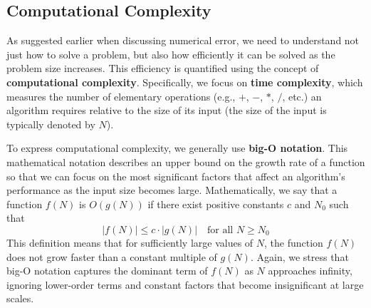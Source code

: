 \subsection{Computational Complexity}
As suggested earlier when discussing numerical error, we need to understand not just how to solve a problem, but also how efficiently it can be solved as the problem size increases. This efficiency is quantified using the concept of \textbf{computational complexity}. Specifically, we focus on \textbf{time complexity}, which measures the number of elementary operations (e.g., $+$, $-$, $*$, $/$, etc.) an algorithm requires relative to the size of its input (the size of the input is typically denoted by $N$).

To express computational complexity, we generally use \textbf{big-O notation}. This mathematical notation describes an upper bound on the growth rate of a function so that we can focus on the most significant factors that affect an algorithm's performance as the input size becomes large. Mathematically, we say that a function $f(N)$ is $O(g(N))$ if there exist positive constants $c$ and $N_0$ such that
\begin{equation*}
    \left|f(N)\right| \leq c \cdot \left|g(N)\right| \quad \text{for all } N \geq N_0
\end{equation*}
This definition means that for sufficiently large values of $N$, the function $f(N)$ does not grow faster than a constant multiple of $g(N)$. Again, we stress that big-O notation captures the dominant term of $f(N)$ as $N$ approaches infinity, ignoring lower-order terms and constant factors that become insignificant at large scales.

